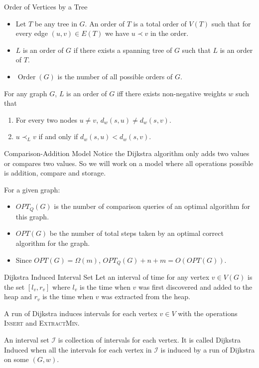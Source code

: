 \documentclass[10pt]{beamer}
\DeclareMathOperator{\order}{Order}
\begin{document}
\begin{frame}{Order of Vertices by a Tree}
	\begin{itemize}
		\item Let $T$ be any tree in $G$. An order of $T$ is a total order of $V(T)$ such that for every edge $(u,v)\in E(T)$ we have $u\prec v$ in the order.\pause
		\item $L$ is an order of $G$ if there exists a spanning tree of $G$ such that $L$ is an order of $T$.\pause
		\item $\order(G)$ is the number of all possible orders of $G$.
	\end{itemize}\pause \vfill

	\begin{theorem}
		For any graph $G$, $L$ is an order of $G$ iff there exists non-negative weights $w$ such that \begin{enumerate}
			\item For every two nodes $u\neq v$, $d_w(s,u)\neq d_w(s,v)$.
			\item $u\prec_L v$ if and only if $d_w(s,u)<d_w(s, v)$.
		\end{enumerate}
	\end{theorem}
\end{frame}
\begin{frame}{Comparison-Addition Model}
	Notice the Dijkstra algorithm only adds two values or compares two values. So we will work on a model where all operations possible is addition, compare and storage. \pause

	For a given graph:
	\begin{itemize}
		\item $OPT_Q(G)$ is the number of comparison queries of an optimal algorithm for this graph.
		\item $OPT(G)$ be the number of total steps taken by an optimal correct algorithm for the graph. \pause
		\item Since $OPT(G)=\Omega(m)$, $OPT_Q(G)+n+m=O(OPT(G))$.
	\end{itemize}

\end{frame}
\begin{frame}{Dijkstra Induced Interval Set}
	Let an interval of time for any vertex $v\in V(G)$ is the set $[l_v,r_v]$ where $l_v$ is the time when $v$ was first discovered and added to the heap and $r_v$ is the time when $v$ was extracted from the heap. \pause \setlength{\parindent}{1cm}\vfill

	A run of Dijkstra induces intervals for each vertex $v\in V$ with the operations \textsc{Insert} and \textsc{ExtractMin}.\pause  \vfill

	An interval set $\mathcal{I}$ is collection of intervals for each vertex. It is called Dijkstra Induced when all the intervals for each vertex in $\mathcal{I}$ is induced by a run of Dijkstra on some $(G,w)$.
\end{frame}
\end{document}
